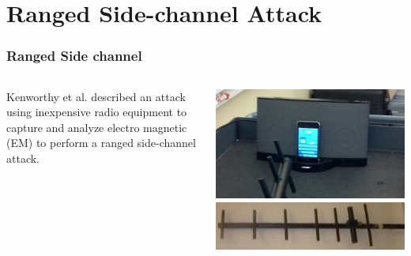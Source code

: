 \documentclass{beamer}
\begin{document}
\begin{frame}
\begin{columns}[t]
\begin{column}{.45\textwidth}
		\end{column}
		\end{columns}
		\end{frame}
		
		
		
\section{Ranged Side-channel Attack}
        \begin{frame}
		\frametitle{Ranged Side channel}
		\begin{columns}
		\begin{column}{.45\textwidth}
		Kenworthy et al. described an attack using inexpensive radio equipment to capture and analyze electro magnetic (EM) to perform a ranged side-channel attack.
		\end{column}
		\begin{column}{.45\textwidth}
		
			 \includegraphics[width=\textwidth]{Images/antennaWithDevice.png}
			 \linebreak
			\includegraphics[width=\textwidth]{Images/antenna.png} 
			
		\end{column}
		\end{columns}
		\end{frame}
\end{document}
